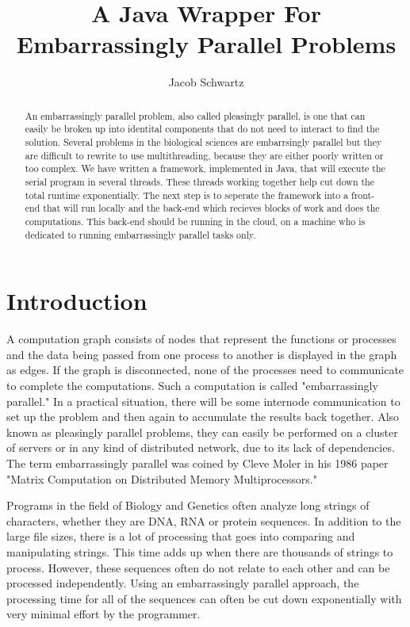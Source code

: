 \documentclass[12pt]{article}
\begin{document}
\title{A Java Wrapper For Embarrassingly Parallel Problems}
\author{Jacob Schwartz}
\maketitle

\begin{abstract}
An embarrassingly parallel problem, also called pleasingly parallel, is one that 
can easily be broken up into identital components that do not need to interact 
to find the solution. Several problems in the biological sciences are 
embarrsingly parallel but they are difficult to rewrite to use multithreading, 
because they are either poorly written or too complex. We have written a 
framework, implemented in Java, that will execute the serial program in several 
threads. These threads working together help cut down the total runtime
exponentially. The next step is to seperate the framework into a front-end that
will run locally and the back-end which recieves blocks of work and does the
computations. This back-end should be running in the cloud, on a machine who is
dedicated to running embarrassingly parallel tasks only.
\end{abstract}

\section{Introduction}

A computation graph consists of nodes that represent the functions or processes 
and the data being passed from one process to another is displayed in the graph 
as edges. If the graph is disconnected, none of the processes need to 
communicate to complete the computations. Such a computation is called
"embarrassingly parallel." In a practical situation, there will be some 
internode communication to set up the problem and then again to accumulate the 
results back together. Also known as pleasingly parallel problems, they can 
easily be performed on a cluster of servers or in any kind of distributed 
network, due to its lack of dependencies. The term embarrassingly parallel was 
coined by Cleve Moler in his 1986 paper "Matrix Computation on Distributed
Memory Multiprocessors." \cite{history}

Programs in the field of Biology and Genetics often analyze long strings of
characters, whether they are DNA, RNA or protein sequences. In addition to the
large file sizes, there is a lot of processing that goes into comparing and
manipulating strings. This time adds up when there are thousands of strings to 
process. However, these sequences often do not relate to each other and can be 
processed independently. Using an embarrassingly parallel approach, the 
processing time for all of the sequences can often be cut down exponentially 
with very minimal effort by the programmer.
\end{document}
